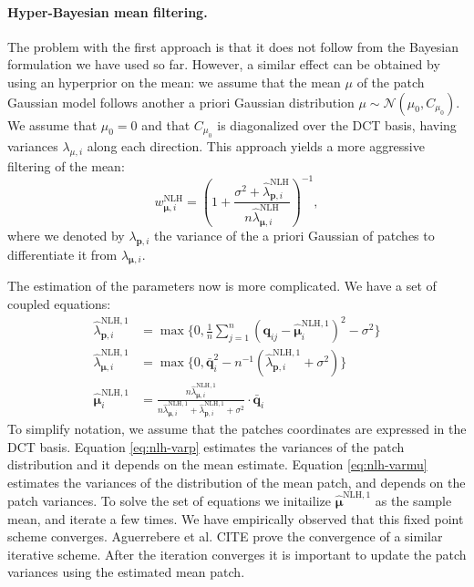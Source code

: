 \documentclass{ipol}
\newcommand{\ma}[1]{\boldsymbol{#1}}
\begin{document}
\paragraph{Hyper-Bayesian mean filtering.}The problem with the first approach is that it does not follow from the
Bayesian formulation we have used so far. However, a similar effect can
be obtained by using an hyperprior on the mean: we assume that the mean
$\mu$ of the patch Gaussian model follows another a priori Gaussian
distribution $\mu\sim\mathcal N(\mu_0,C_{\mu_0})$. We assume that $\mu_0 = 0$
and that $C_{\mu_0}$ is diagonalized over the DCT basis, having variances
$\lambda_{\mu,i}$ along each direction. This approach yields a more aggressive
filtering of the mean:
\[
	w^{\text{NLH}}_{\ma\mu,i}
	= \left(1 + \frac{\sigma^2 + \hat \lambda_{\ma p,i}^{\text{NLH}}}{n\hat \lambda^{\text{NLH}}_{\ma\mu,i}}\right)^{-1},
\]
where we denoted by $\lambda_{\ma p,i}$ the variance of the a priori Gaussian of
patches to differentiate it from $\lambda_{\ma \mu,i}$.

The estimation of the parameters now is more complicated. We have a set 
of coupled equations:
\begin{align}
	\hat \lambda^{\text{NLH},1}_{\ma p,i} &= 
		\max\{0,\frac1n\sum_{j = 1}^n (\ma q_{ij} - \hat {\ma \mu}^{\text{NLH},1}_i)^2
		- \sigma^2\}
		\label{eq:nlh-varp}\\
%
	\hat \lambda^{\text{NLH},1}_{\ma\mu,i} &= 
		\max\{0, \bar{\ma q}_i^2 - n^{-1}(\hat \lambda_{\ma p,i}^{\text{NLH},1} + \sigma^2)\}
		\label{eq:nlh-varmu}\\
%
	\hat{\ma\mu}^{\text{NLH},1}_i &=
		\frac{n\hat{\lambda}_{\ma\mu,i}^{\text{NLH},1}}
		     {n\hat{\lambda}_{\ma\mu,i}^{\text{NLH},1} + 
			    \hat{\lambda}_{\ma  p,i}^{\text{NLH},1} + \sigma^2} \cdot \bar{\ma q}_i	
		\label{eq:nlh-wienermu}
\end{align}
To simplify notation, we assume that the patches coordinates are expressed in
the DCT basis.
Equation \eqref{eq:nlh-varp} estimates the variances of the patch distribution
and it depends on the mean estimate. Equation \eqref{eq:nlh-varmu} estimates the
variances of the distribution of the mean patch, and depends on the patch 
variances. To solve the set of equations we initailize $\hat{\ma\mu}^{\text{NLH},1}$ as 
the sample mean, and iterate a few times. We have empirically observed that this
fixed point scheme converges. Aguerrebere et al. CITE prove the convergence of a
similar iterative scheme.
After the iteration converges it is important to update the patch variances using
the estimated mean patch.
\end{document}
